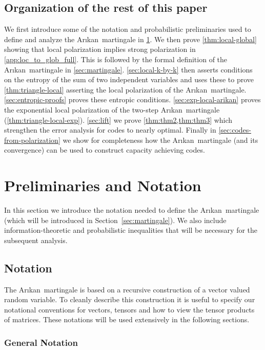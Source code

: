 \documentclass[11pt]{article}
\newcommand{\Arikan}{Ar\i kan}
\begin{document}
\subsection{Organization of the rest of this paper}
We first introduce some of
the notation and probabilistic preliminaries used to define and analyze the
\Arikan\ martingale in \cref{app:prelims}.
We then prove \cref{thm:local-global} showing that  local polarization implies strong
polarization in \cref{app:loc_to_glob_full}.
This is followed by the formal
definition of the \Arikan\ martingale in \cref{sec:martingale}.
\cref{sec:local-k-by-k} then asserts conditions on the entropy of the sum of two independent variables and uses these to prove \cref{thm:triangle-local} asserting the local polarization of the \Arikan\ martingale.
\cref{sec:entropic-proofs} proves these entropic conditions. 
\cref{sec:exp-local-arikan} proves the exponential local polarization of the two-step \Arikan\ martingale (\cref{thm:triangle-local-exp}). 
\cref{sec:lift} we prove \cref{thm:thm2,thm:thm3} which strengthen the error analysis for codes to nearly optimal. 
Finally in \cref{sec:codes-from-polarization} we show for completeness how the \Arikan\ martingale (and its convergence) can be used to construct capacity achieving codes.

\section{Preliminaries and Notation}
\label{app:prelims}


In this section we introduce the notation needed to define the \Arikan\ martingale (which will be introduced in Section~\ref{sec:martingale}).
We also include information-theoretic and probabilistic inequalities that will
be necessary for the subsequent analysis.

\subsection{Notation}

The \Arikan\ martingale is based on a recursive construction of a vector valued random variable. To cleanly describe this construction it is useful to specify our notational conventions for vectors, tensors and how to view the tensor products of matrices. These notations will be used extensively in the following sections.

\subsubsection{General Notation}
\end{document}
